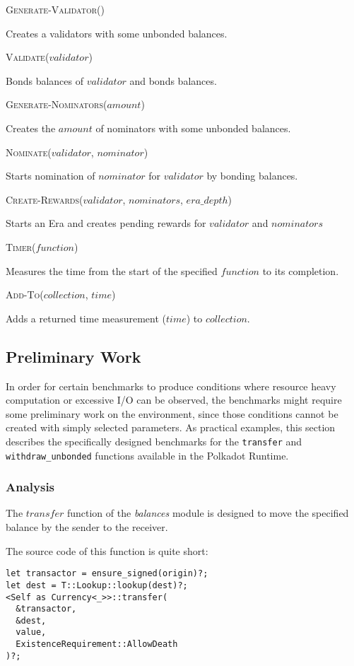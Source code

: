 \documentclass[11pt,a4paper]{article}
\newcommand{\SubItem}[1]{
    {\setlength\itemindent{15pt} \item[-] #1}
}
\begin{document}
\begin{itemize}
  \item \textsc{Generate-Validator()}
  \SubItem{Creates a validators with some unbonded balances.}
  \item \textsc{Validate($validator$)}
  \SubItem{Bonds balances of $validator$ and bonds balances.}
  \item \textsc{Generate-Nominators($amount$)}
  \SubItem{Creates the $amount$ of nominators with some unbonded balances.}
  \item \textsc{Nominate($validator$, $nominator$)}
  \SubItem{Starts nomination of $nominator$ for $validator$ by bonding balances.}
  \item \textsc{Create-Rewards($validator$, $nominators$, $era\_depth$)}
  \SubItem{Starts an Era and creates pending rewards for $validator$ and $nominators$}
  \item \textsc{Timer($function$)} \SubItem{Measures the time from the start of
      the specified $function$ to its completion.}
  \item \textsc{Add-To($collection$, $time$)} \SubItem{Adds a returned time
      measurement ($time$) to $collection$.}
\end{itemize}

\subsection{Preliminary Work}\label{sect:examples-preliminary-work}
In order for certain benchmarks to produce conditions where resource heavy
computation or excessive I/O can be observed, the benchmarks might require some
preliminary work on the environment, since those conditions cannot be created
with simply selected parameters. As practical examples, this section describes
the specifically designed benchmarks for the \verb|transfer| and
\verb|withdraw_unbonded| functions available in the Polkadot Runtime.

\subsubsection*{Analysis}

The $transfer$ function of the \textit{balances} module is designed to move the
specified balance by the sender to the receiver.
\newline

The source code of this function is quite short:

\begin{verbatim}
let transactor = ensure_signed(origin)?;
let dest = T::Lookup::lookup(dest)?;
<Self as Currency<_>>::transfer(
  &transactor,
  &dest,
  value,
  ExistenceRequirement::AllowDeath
)?;
\end{verbatim}
\end{document}
